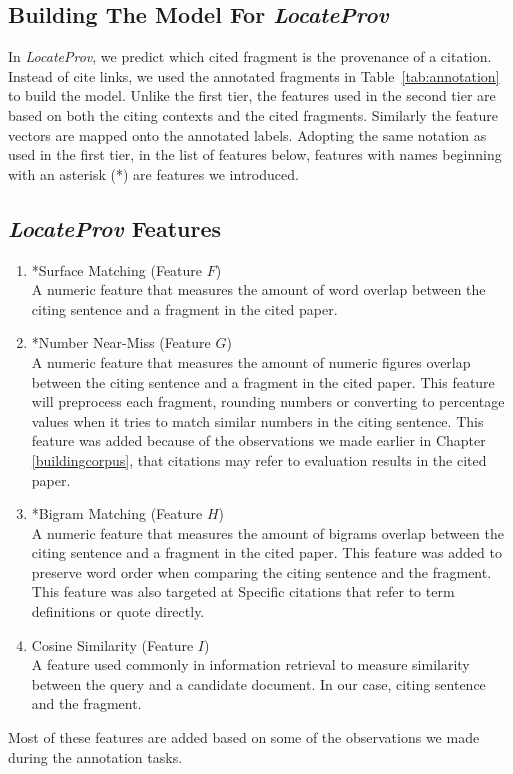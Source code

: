 \subsection*{Building The Model For {\it LocateProv}}
In {\it LocateProv}, we predict which cited fragment is the provenance of a citation. Instead of cite links, we used the annotated fragments in Table~\ref{tab:annotation} to build the model. Unlike the first tier, the features used in the second tier are based on both the citing contexts and the cited fragments. Similarly the feature vectors are mapped onto the annotated labels. Adopting the same notation as used in the first tier, in the list of features below, features with names beginning with an asterisk (*) are features we introduced.

\subsection*{{\it LocateProv} Features}
\begin{enumerate}
\item *Surface Matching (Feature $F$)\\
A numeric feature that measures the amount of word overlap between the citing sentence and a fragment in the cited paper.

\item *Number Near-Miss (Feature $G$)\\
A numeric feature that measures the amount of numeric figures overlap between the citing sentence and a fragment in the cited paper. This feature will preprocess each fragment, rounding numbers or converting to percentage values when it tries to match similar numbers in the citing sentence. This feature was added because of the observations we made earlier in Chapter \ref{buildingcorpus}, that citations may refer to evaluation results in the cited paper.

\item *Bigram Matching (Feature $H$)\\
A numeric feature that measures the amount of bigrams overlap between the citing sentence and a fragment in the cited paper. This feature was added to preserve word order when comparing the citing sentence and the fragment. This feature was also targeted at Specific citations that refer to term definitions or quote directly.

\item Cosine Similarity (Feature $I$)\\
A feature used commonly in information retrieval to measure similarity between the query and a candidate document. In our case, citing sentence and the fragment.
\end{enumerate}
Most of these features are added based on some of the observations we made during the annotation tasks.

